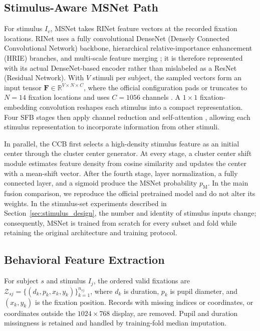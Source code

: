 \documentclass[conference,a4paper]{IEEEtran}
\begin{document}
\subsection{Stimulus-Aware MSNet Path}
For stimulus $I_v$, MSNet takes RINet feature vectors at the recorded fixation locations. RINet uses a fully convolutional DenseNet (Densely Connected Convolutional Network) backbone, hierarchical relative-importance enhancement (HRIE) branches, and multi-scale feature merging \cite{song2023rinet}; it is therefore represented with its actual DenseNet-based encoder rather than mislabeled as a ResNet (Residual Network). With $V$ stimuli per subject, the sampled vectors form an input tensor $\mathbf{F}\in\mathbb{R}^{V\times N\times C}$, where the official configuration pads or truncates to $N=14$ fixation locations and uses $C=1056$ channels \cite{song2024ems}. A $1\times1$ fixation-embedding convolution reshapes each stimulus into a compact representation. Four SFB stages then apply channel reduction and self-attention \cite{vaswani2017attention}, allowing each stimulus representation to incorporate information from other stimuli.

In parallel, the CCB first selects a high-density stimulus feature as an initial center through the cluster center generator. At every stage, a cluster center shift module estimates feature density from cosine similarity and updates the center with a mean-shift vector. After the fourth stage, layer normalization, a fully connected layer, and a sigmoid produce the MSNet probability $p_{\mathrm{M}}$. In the main fusion comparison, we reproduce the official pretrained model and do not alter its weights. In the stimulus-set experiments described in Section~\ref{sec:stimulus_design}, the number and identity of stimulus inputs change; consequently, MSNet is trained from scratch for every subset and fold while retaining the original architecture and training protocol.

\subsection{Behavioral Feature Extraction}
For subject $s$ and stimulus $I_j$, the ordered valid fixations are
$\mathcal{Z}_{sj}=\{(d_k,p_k,x_k,y_k)\}_{k=1}^{n_{sj}}$, where $d_k$ is duration, $p_k$ is pupil diameter, and $(x_k,y_k)$ is the fixation position. Records with missing indices or coordinates, or coordinates outside the $1024\times768$ display, are removed. Pupil and duration missingness is retained and handled by training-fold median imputation.
\end{document}
